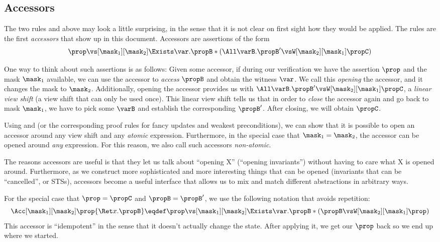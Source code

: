\subsection{Accessors}

The two rules  and  above may look a little surprising, in the sense that it is not clear on first sight how they would be applied.
The rules are the first \emph{accessors} that show up in this document.
Accessors are assertions of the form
\[ \prop \vs[\mask_1][\mask_2] \Exists\var. \propB * (\All\varB. \propB' \vsW[\mask_2][\mask_1] \propC) \]

One way to think about such assertions is as follows:
Given some accessor, if during our verification we have the assertion $\prop$ and the mask $\mask_1$ available, we can use the accessor to \emph{access} $\propB$ and obtain the witness $\var$.
We call this \emph{opening} the accessor, and it changes the mask to $\mask_2$.
Additionally, opening the accessor provides us with $\All\varB. \propB' \vsW[\mask_2][\mask_1] \propC$, a \emph{linear view shift} (\ie a view shift that can only be used once).
This linear view shift tells us that in order to \emph{close} the accessor again and go back to mask $\mask_1$, we have to pick some $\varB$ and establish the corresponding $\propB'$.
After closing, we will obtain $\propC$.

Using  and  (or the corresponding proof rules for fancy updates and weakest preconditions), we can show that it is possible to open an accessor around any view shift and any \emph{atomic} expression.
Furthermore, in the special case that $\mask_1 = \mask_2$, the accessor can be opened around \emph{any} expression.
For this reason, we also call such accessors \emph{non-atomic}.

The reasons accessors are useful is that they let us talk about ``opening X'' (\eg ``opening invariants'') without having to care what X is opened around.
Furthermore, as we construct more sophisticated and more interesting things that can be opened (\eg invariants that can be ``cancelled'', or STSs), accessors become a useful interface that allows us to mix and match different abstractions in arbitrary ways.

For the special case that $\prop = \propC$ and $\propB = \propB'$, we use the following notation that avoids repetition:
\[ \Acc[\mask_1][\mask_2]\prop{\Ret x. \propB} \eqdef \prop \vs[\mask_1][\mask_2] \Exists\var. \propB * (\propB \vsW[\mask_2][\mask_1] \prop)  \]
This accessor is ``idempotent'' in the sense that it doesn't actually change the state.  After applying it, we get our $\prop$ back so we end up where we started.

